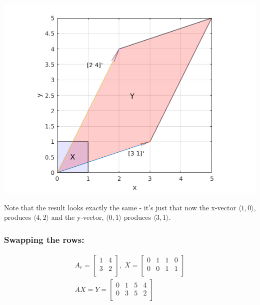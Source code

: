 \documentclass[MathsNotesBase.tex]{subfiles}
\begin{document}
{		\begin{center}
		\includegraphics[scale=0.85]{resources/img/GeometryOfMatrices_images/linear_transformation.png}
		\end{center}
		
		Note that the result looks exactly the same - it's just that now the x-vector $\langle 1, 0 \rangle$, produces $\langle 4, 2 \rangle$ and the y-vector, $\langle 0, 1 \rangle$ produces $\langle 3, 1 \rangle$.
			
		\subsubsection{Swapping the rows:}
		\begin{align*}
		A_r =
		\begin{bmatrix}    
		1  &   4 \\
		3  &   2 \\		
		\end{bmatrix}
		,\; X = 
		\begin{bmatrix}  
		0   &  1  &   1  &   0 \\
		0   &  0  &   1  &   1	\\	
		\end{bmatrix} \\[10pt]
		AX = Y = 
		\begin{bmatrix}   
		0  &   1  &   5  &   4 \\
		0  &   3  &   5  &   2	\\
		\end{bmatrix}
		\end{align*}
		
}
\end{document}
